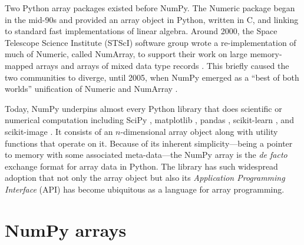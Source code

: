 Two Python array packages existed before NumPy.
The Numeric package began in the mid-90s and provided an array object in
Python, written in C, and linking to standard fast implementations of linear
algebra.
Around 2000, the Space Telescope Science Institute (STScI) software group wrote
a re-implementation of much of Numeric, called NumArray, to support their work
on large memory-mapped arrays and arrays of mixed data type
records \cite{STScI-slither}.
This briefly caused the two communities to diverge, until
2005, when NumPy emerged as a ``best of both worlds'' unification of Numeric
and NumArray \cite{oliphant2006guide}.

Today, NumPy underpins almost every Python library that does scientific or
numerical computation including SciPy \cite{virtanen2019scipy},
matplotlib \cite{hunter2007matplotlib}, pandas \cite{mckinney-proc-scipy-2010},
scikit-learn \cite{pedregosa2011scikit}, and
scikit-image \cite{vanderwalt2014scikit}.
It consists of an $n$-dimensional array object along with utility functions
that operate on it.
Because of its inherent simplicity---being a pointer to memory with some
associated meta-data---the NumPy array is
the {\it de facto} exchange format for array data in Python.
The library has such widespread adoption that not only the array object but also its
{\it Application Programming Interface} (API) has become ubiquitous as
a language for array programming.

\section*{NumPy arrays}

